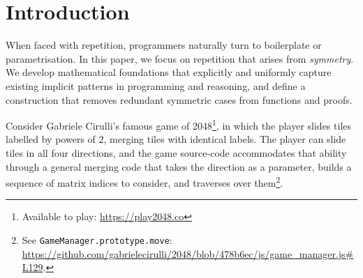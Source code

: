 \section{Introduction}

When faced with repetition, programmers naturally turn to boilerplate or
parametrisation. In this paper, we focus on repetition that
arises from \emph{symmetry}. We develop
mathematical foundations that explicitly and uniformly capture
existing implicit patterns in programming and reasoning, and
define a construction that removes redundant symmetric cases from
functions and proofs.

Consider Gabriele Cirulli's famous game of 2048\footnote{Available to
play: \url{https://play2048.co}}, in which the player slides tiles
labelled by powers of $2$, merging tiles with identical labels. The
player can slide tiles in all four directions, and the game
source-code accommodates that ability through a general merging code
that takes the direction as a parameter, builds a sequence of matrix
indices to consider, and traverses over them\footnote{See
\texttt{GameManager.prototype.move}:
\url{https://github.com/gabrielecirulli/2048/blob/478b6ec/js/game_manager.js\#L129}.}.

